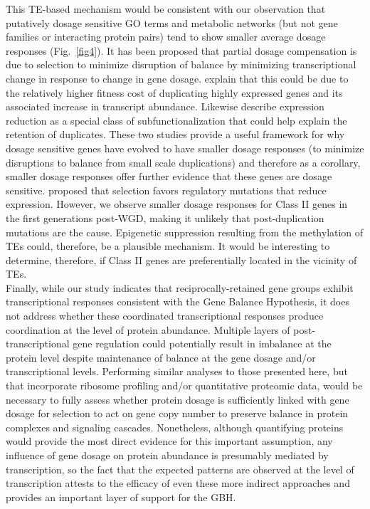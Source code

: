 \documentclass[11pt]{article}
\begin{document}
This TE-based mechanism would be consistent with our observation that putatively dosage sensitive GO terms and metabolic networks (but not gene families or interacting protein pairs) tend to show smaller average dosage responses (Fig.~\ref{fig4}).
It has been proposed that partial dosage compensation is due to selection to minimize disruption of balance by minimizing transcriptional change in response to change in gene dosage.
\cite{katju2018} explain that this could be due to the relatively higher fitness cost of duplicating highly expressed genes and its associated increase in transcript abundance.
Likewise \cite{qian2010} describe expression reduction as a special class of subfunctionalization that could help explain the retention of duplicates.
These two studies provide a useful framework for why dosage sensitive genes have evolved to have smaller dosage responses (to minimize disruptions to balance from small scale duplications) and therefore as a corollary, smaller dosage responses offer further evidence that these genes are dosage sensitive.
\cite{qian2010} proposed that selection favors regulatory mutations that reduce expression.
However, we observe smaller dosage responses for Class II genes in the first generations post-WGD, making it unlikely that post-duplication mutations are the cause.
Epigenetic suppression resulting from the methylation of TEs could, therefore, be a plausible mechanism.
It would be interesting to determine, therefore, if Class II genes are preferentially located in the vicinity of TEs.\\

Finally, while our study indicates that reciprocally-retained gene groups exhibit transcriptional responses consistent with the Gene Balance Hypothesis, it does not address whether these coordinated transcriptional responses produce coordination at the level of protein abundance.
Multiple layers of post-transcriptional gene regulation could potentially result in imbalance at the protein level despite maintenance of balance at the gene dosage and/or transcriptional levels.
Performing similar analyses to those presented here, but that incorporate ribosome profiling \citep{taggart2018} and/or quantitative proteomic data, would be necessary to fully assess whether protein dosage is sufficiently linked with gene dosage for selection to act on gene copy number to preserve balance in protein complexes and signaling cascades.
Nonetheless, although quantifying proteins would provide the most direct evidence for this important assumption, any influence of gene dosage on protein abundance is presumably mediated by transcription, so the fact that the expected patterns are observed at the level of transcription attests to the efficacy of even these more indirect approaches and provides an important layer of support for the GBH.\\
\end{document}
